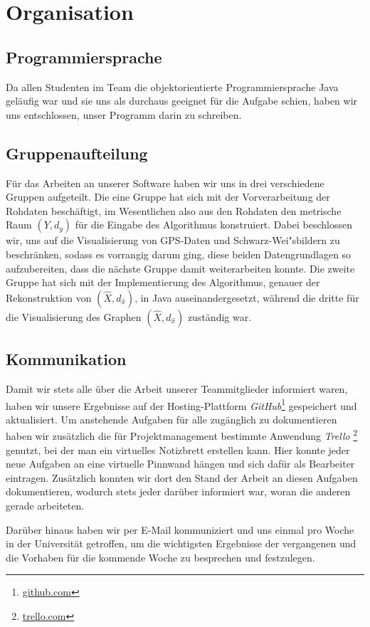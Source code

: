 \documentclass[parskip=half,
 fontsize=12pt, bibtotoc,
 ngerman]
 {article}
\begin{document}
\section{Organisation}
\subsection{Programmiersprache}
Da allen Studenten im Team die objektorientierte Programmiersprache Java geläufig war und sie uns als durchaus geeignet für die Aufgabe schien, haben wir uns entschlossen, unser Programm darin zu schreiben.

\subsection{Gruppenaufteilung}
Für das Arbeiten an unserer Software haben wir uns in drei verschiedene Gruppen aufgeteilt. Die eine Gruppe hat sich mit der Vorverarbeitung der Rohdaten beschäftigt, im Wesentlichen also aus den Rohdaten den metrische Raum $\left(Y, d_y\right)$ für die Eingabe des Algorithmus konstruiert. Dabei beschlossen wir, uns auf die Visualisierung von GPS-Daten und Schwarz-Wei"sbildern zu beschr\"anken, sodass es vorrangig darum ging, diese beiden Datengrundlagen so aufzubereiten, dass die nächste Gruppe damit weiterarbeiten konnte. Die zweite Gruppe hat sich mit der Implementierung des Algorithmus, genauer der Rekonstruktion von $(\hat{X}, d_{\hat{x}})$, in Java auseinandergesetzt, während die dritte für die Visualisierung des Graphen $(\hat{X}, d_{\hat{x}})$ zuständig war.

\subsection{Kommunikation}
Damit wir stets alle über die Arbeit unserer Teammitglieder informiert waren, haben wir unsere Ergebnisse auf der Hosting-Plattform \textit{GitHub}\footnote{\url{github.com}} gespeichert und aktualisiert. Um anstehende Aufgaben für alle zugänglich zu dokumentieren haben wir zusätzlich die für Projektmanagement bestimmte Anwendung \textit{Trello} \footnote{\url{trello.com}} genutzt, bei der man ein virtuelles Notizbrett erstellen kann. Hier konnte jeder neue Aufgaben an eine virtuelle Pinnwand hängen und sich dafür als Bearbeiter eintragen. Zusätzlich konnten wir dort den Stand der Arbeit an diesen Aufgaben dokumentieren, wodurch stets jeder darüber informiert war, woran die anderen gerade arbeiteten.

Darüber hinaus haben wir per E-Mail kommuniziert und uns einmal pro Woche in der Universität getroffen, um die wichtigsten Ergebnisse der vergangenen und die Vorhaben für die kommende Woche zu besprechen und festzulegen.
 
\end{document}
